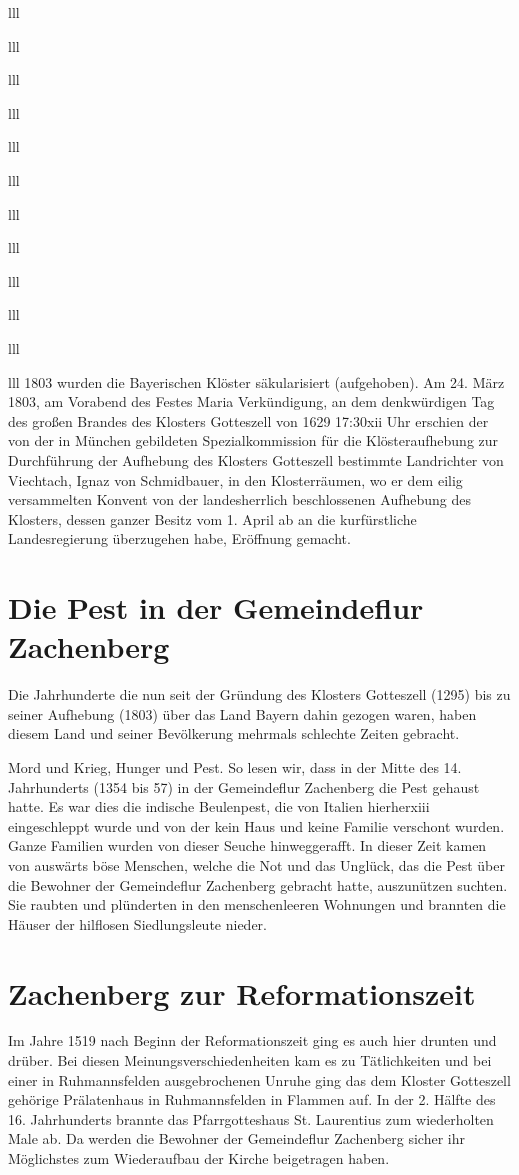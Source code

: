 \documentclass[12pt,a4pager]{book}
\begin{document}
\begin{tabuluar}{lll}
\begin{tabuluar}{lll}
\begin{tabuluar}{lll}
\begin{tabuluar}{lll}
\begin{tabuluar}{lll}
\begin{tabuluar}{lll}
\begin{tabuluar}{lll}
\begin{tabuluar}{lll}
\begin{tabuluar}{lll}
\begin{tabuluar}{lll}
\begin{tabuluar}{lll}
\begin{tabuluar}{lll}
1803 wurden die Bayerischen Klöster säkularisiert (aufgehoben). Am 24. März
1803, am Vorabend des Festes Maria Verkündigung, an dem denkwürdigen Tag des
großen Brandes des Klosters Gotteszell von 1629 17:30xii Uhr erschien der von
der in München gebildeten Spezialkommission für die Klösteraufhebung zur
Durchführung der Aufhebung des Klosters Gotteszell bestimmte Landrichter von
Viechtach, Ignaz von Schmidbauer, in den Klosterräumen, wo er dem eilig
versammelten Konvent von der landesherrlich beschlossenen Aufhebung des
Klosters, dessen ganzer Besitz vom 1. April ab an die kurfürstliche
Landesregierung überzugehen habe, Eröffnung gemacht.

\section{Die Pest in der Gemeindeflur Zachenberg}

Die Jahrhunderte die nun seit der Gründung des Klosters Gotteszell (1295) bis zu
seiner Aufhebung (1803) über das Land Bayern dahin gezogen waren, haben diesem
Land und seiner Bevölkerung mehrmals schlechte Zeiten gebracht.

Mord und Krieg, Hunger und Pest. So lesen wir, dass in der Mitte des 14.
Jahrhunderts (1354 bis 57) in der Gemeindeflur Zachenberg die Pest gehaust
hatte. Es war dies die indische Beulenpest, die von Italien hierherxiii
eingeschleppt wurde und von der kein Haus und keine Familie verschont wurden.
Ganze Familien wurden von dieser Seuche hinweggerafft. In dieser Zeit kamen von
auswärts böse Menschen, welche die Not und das Unglück, das die Pest über die
Bewohner der Gemeindeflur Zachenberg gebracht hatte, auszunützen suchten. Sie
raubten und plünderten in den menschenleeren Wohnungen und brannten die Häuser
der hilflosen Siedlungsleute nieder.

\section{Zachenberg zur Reformationszeit}

Im Jahre 1519 nach Beginn der Reformationszeit ging es auch hier drunten und
drüber. Bei diesen Meinungsverschiedenheiten kam es zu Tätlichkeiten und bei
einer in Ruhmannsfelden ausgebrochenen Unruhe ging das dem Kloster Gotteszell
gehörige Prälatenhaus in Ruhmannsfelden in Flammen auf. In der 2. Hälfte des 16.
Jahrhunderts brannte das Pfarrgotteshaus St. Laurentius zum wiederholten Male
ab. Da werden die Bewohner der Gemeindeflur Zachenberg sicher ihr Möglichstes
zum Wiederaufbau der Kirche beigetragen haben.


\end{tabuluar}
\end{tabuluar}
\end{tabuluar}
\end{tabuluar}
\end{tabuluar}
\end{tabuluar}
\end{tabuluar}
\end{tabuluar}
\end{tabuluar}
\end{tabuluar}
\end{tabuluar}
\end{tabuluar}
\end{document}
